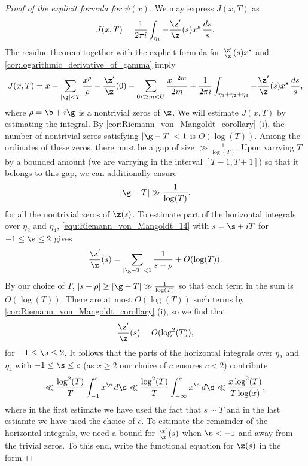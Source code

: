 \begin{proof}[Proof of the explicit formula for $\psi(x)$]
        We may express $J(x,T)$ as
        \[
          J(x,T) = \frac{1}{2\pi i}\int_{\eta_{1}}-\frac{\z'}{\z}(s)x^{s}\,\frac{ds}{s}.
        \]
        The residue theorem together with the explicit formula for $\frac{\z'}{\z}(s)x^{s}$ and \cref{cor:logarithmic_derivative_of_gamma} imply
        \begin{equation}\label{equ:explicit_formula_proof_7}
          J(x,T) = x-\sum_{|\g| < T}\frac{x^{\rho}}{\rho}-\frac{\z'}{\z}(0)-\sum_{0 < 2m < U}\frac{x^{-2m}}{2m}+\frac{1}{2\pi i}\int_{\eta_{1}+\eta_{2}+\eta_{3}}-\frac{\z'}{\z}(s)x^{s}\,\frac{ds}{s},
        \end{equation}
        where $\rho = \b+i\g$ is a nontrivial zeros of $\z$. We will estimate $J(x,T)$ by estimating the integral. By \cref{cor:Riemann_von_Mangoldt_corollary} (i), the number of nontrivial zeros satisfying $|\g-T| < 1$ is $O(\log(T))$. Among the ordinates of these zeros, there must be a gap of size $\gg \frac{1}{\log(T)}$. Upon varrying $T$ by a bounded amount (we are varrying in the interval $[T-1,T+1]$) so that it belongs to this gap, we can additionally ensure
        \[
          |\g-T| \gg \frac{1}{\log(T)},
        \]
        for all the nontrivial zeros of $\z(s)$. To estimate part of the horizontal integrals over $\eta_{2}$ and $\eta_{4}$, \cref{equ:Riemann_von_Mangoldt_14} with $s = \s+iT$ for $-1 \le \s \le 2$ gives
        \[
          \frac{\z'}{\z}(s) = \sum_{|\g-T| < 1}\frac{1}{s-\rho}+O(\log(T)).
        \]
        By our choice of $T$, $|s-\rho| \ge |\g-T| \gg \frac{1}{\log(T)}$ so that each term in the sum is $O(\log(T))$. There are at most $O(\log(T))$ such terms by \cref{cor:Riemann_von_Mangoldt_corollary} (i), so we find that
        \[
          \frac{\z'}{\z}(s) = O(\log^{2}(T)),
        \]
        for $-1 \le \s \le 2$. It follows that the parts of the horizontal integrals over $\eta_{2}$ and $\eta_{4}$ with  $-1 \le \s \le c$ (as $x \ge 2$ our choice of $c$ ensures $c < 2$) contribute
        \begin{equation}\label{equ:explicit_formula_proof_8}
          \ll \frac{\log^{2}(T)}{T}\int_{-1}^{c}x^{\s}\,d\s \ll \frac{\log^{2}(T)}{T}\int_{-\infty}^{c}x^{\s}\,d\s \ll \frac{x\log^{2}(T)}{T\log(x)},
        \end{equation}
        where in the first estimate we have used the fact that $s \sim T$ and in the last estiamte we have used the choice of $c$. To estimate the remainder of the horizontal integrals, we need a bound for $\frac{\z'}{\z}(s)$ when $\s < -1$ and away from the trivial zeros. To this end, write the functional equation for $\z(s)$ in the form

\end{proof}
